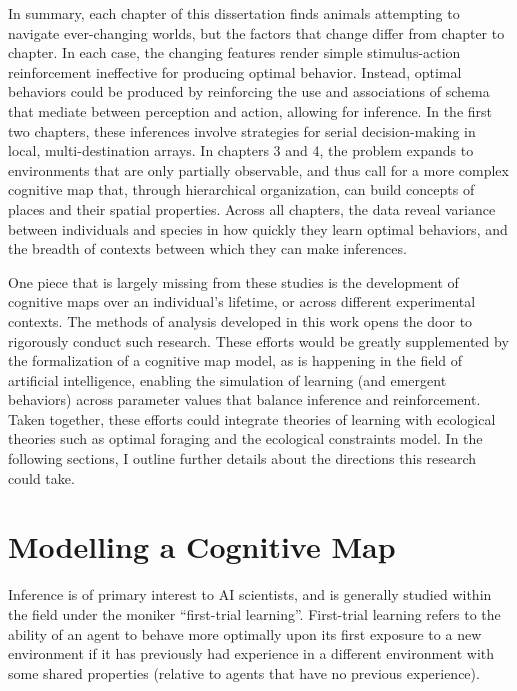 \documentclass[twoside,12pt,final]{ucthesis-CA2012}
\begin{document}
\begin{ucmainmatter}
In summary, each chapter of this dissertation finds animals attempting to navigate ever-changing worlds, but the factors that change differ from chapter to chapter. In each case, the changing features render simple stimulus-action reinforcement ineffective for producing optimal behavior. Instead, optimal behaviors could be produced by reinforcing the use and associations of schema that mediate between perception and action, allowing for inference. In the first two chapters, these inferences involve strategies for serial decision-making in local, multi-destination arrays. In chapters 3 and 4, the problem expands to environments that are only partially observable, and thus call for a more complex cognitive map that, through hierarchical organization, can build concepts of places and their spatial properties. Across all chapters, the data reveal variance between individuals and species in how quickly they learn optimal behaviors, and the breadth of contexts between which they can make inferences.

One piece that is largely missing from these studies is the development of cognitive maps over an individual's lifetime, or across different experimental contexts. The methods of analysis developed in this work opens the door to rigorously conduct such research. These efforts would be greatly supplemented by the formalization of a cognitive map model, as is happening in the field of artificial intelligence, enabling the simulation of learning (and emergent behaviors) across parameter values that balance inference and reinforcement. Taken together, these efforts could integrate theories of learning with ecological theories such as optimal foraging and the ecological constraints model. In the following sections, I outline further details about the directions this research could take.

\hypertarget{modelling-a-cognitive-map}{%
\section{Modelling a Cognitive Map}\label{modelling-a-cognitive-map}}

Inference is of primary interest to AI scientists, and is generally studied within the field under the moniker ``first-trial learning''. First-trial learning refers to the ability of an agent to behave more optimally upon its first exposure to a new environment if it has previously had experience in a different environment with some shared properties (relative to agents that have no previous experience).


\end{ucmainmatter}
\end{document}
